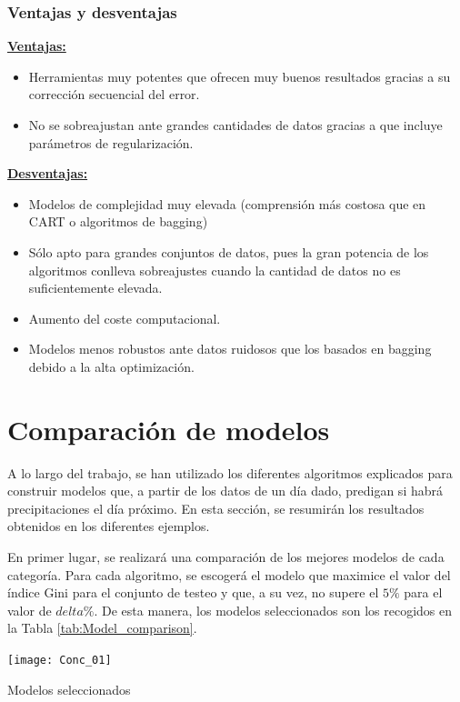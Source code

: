 \documentclass[12pt,twoside]{article}
\begin{document}
\subsubsection{Ventajas y desventajas}

\textbf{\underline{Ventajas:}}
\begin{itemize}
\item Herramientas muy potentes que ofrecen muy buenos resultados gracias a su corrección secuencial del error.

\item No se sobreajustan ante grandes cantidades de datos gracias a que incluye parámetros de regularización.
\end{itemize}

\textbf{\underline{Desventajas:}}
\begin{itemize}
\item Modelos de complejidad muy elevada (comprensión más costosa que en CART o algoritmos de bagging)

\item Sólo apto para grandes conjuntos de datos, pues la gran potencia de los algoritmos conlleva sobreajustes cuando la cantidad de datos no es suficientemente elevada.

\item Aumento del coste computacional.

\item Modelos menos robustos ante datos ruidosos que los basados en bagging debido a la alta optimización.
\end{itemize}





\newpage
\section{Comparación de modelos}

A lo largo del trabajo, se han utilizado los diferentes algoritmos explicados para construir modelos que, a partir de los datos de un día dado, predigan si habrá precipitaciones el día próximo. En esta sección, se resumirán los resultados obtenidos en los diferentes ejemplos.

En primer lugar, se realizará una comparación de los mejores modelos de cada categoría. Para cada algoritmo, se escogerá el modelo que maximice el valor del índice Gini para el conjunto de testeo y que, a su vez, no supere el $5\%$ para el valor de $delta\%$. De esta manera, los modelos seleccionados son  los recogidos en la Tabla \ref{tab:Model_comparison}.
\begin{table}[h]
\centering
\texttt{[image: Conc\_01]}
\caption{Modelos seleccionados}
\label{tab:Model_comparison}
\end{table}
\end{document}
